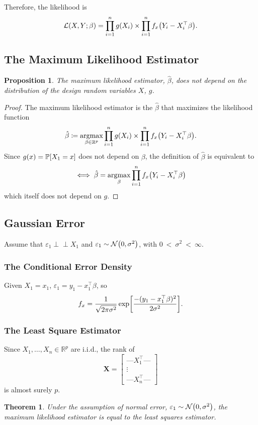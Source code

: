 \documentclass[letterpaper, reqno]{amsart}
\newtheorem{theorem}{Theorem}[section]
\newtheorem{prop}{Proposition}[section]
\numberwithin{equation}{section}
\newcommand{\T}{\top} %
\newcommand{\vect}[1]{\boldsymbol{\mathbf{#1}}} %
\newcommand{\Prob}[1]{\mathbb{P}\mleft[#1\mright]}
\newcommand{\Li}[1]{\mathcal{L}\mleft( #1 \mright)}  %
\newcommand{\R}{\mathbb{R}}  %
\newcommand{\N}[2]{\mathcal{N}\mleft( #1, #2 \mright)}
\newcommand{\indep}{\perp \!\!\! \perp}  %
\newcommand{\iid}{i.i.d.}
\newcommand{\Xm}{\vect{X}}
\newcommand{\Bv}{\beta}
\newcommand{\Bvh}{\hat{\beta}}
\newcommand{\ve}{\varepsilon}
\DeclareMathOperator*{\argmax}{argmax}
\begin{document}
Therefore, the likelihood is
  \[ \Li{X, Y; \Bv} = \prod_{i=1}^n g(X_i) \times \prod_{i=1}^n f_x\mleft(Y_i - X_i^\T\Bv\mright). \]

\subsection{The Maximum Likelihood Estimator}
\begin{prop}
  The maximum likelihood estimator, $\Bvh$, does not depend on the distribution
  of the design random variables $X$, $g$.
\end{prop}

\begin{proof}
  The maximum likelihood estimator is the $\Bvh$ that maximizes the likelihood
  function
  \[ \Bvh \coloneqq \argmax_{\Bv \in \R^p} \prod_{i=1}^n g(X_i) 
    \times \prod_{i=1}^n f_x\mleft(Y_i - X_i^\T\Bv\mright). \]
  Since $g(x) = \Prob{X_1 = x}$ does not depend on $\Bv$, the definition of
  $\Bvh$ is equivalent to
  \[ \iff \Bvh = \argmax_\Bv \prod_{i=1}^n f_x\mleft(Y_i - X_i^\T\Bv\mright) \]
  which itself does not depend on $g$.
\end{proof}

\subsection{Gaussian Error}
Assume that $\ve_1 \indep X_1$ and $\ve_1 \sim \N{0}{\sigma^2}$,
with $0~<~\sigma^2~<~\infty$.

\subsubsection{The Conditional Error Density}
Given $X_1 = x_1$, $\ve_1 = y_1 - x_1^\T\Bv$, so
\[ f_x = \frac{1}{\sqrt{2\pi\sigma^2}} \exp \mleft[\frac{-(y_1 - x_1^\T\Bv)^2}{2\sigma^2}\mright]. \]

\subsubsection{The Least Square Estimator}
Since $X_1, \dots, X_n \in \R^p$ are \iid, the rank of
\[ \Xm = \begin{bmatrix} 
            \text{---} X_1^\T \text{---} \\
            \vdots \\ 
            \text{---} X_n^\T \text{---} 
          \end{bmatrix} 
\]
is almost surely $p$.

\begin{theorem}
  Under the assumption of normal error, $\ve_1 \sim \N{0}{\sigma^2}$, the maximum
  likelihood estimator is equal to the least squares estimator.
\end{theorem}
\end{document}
